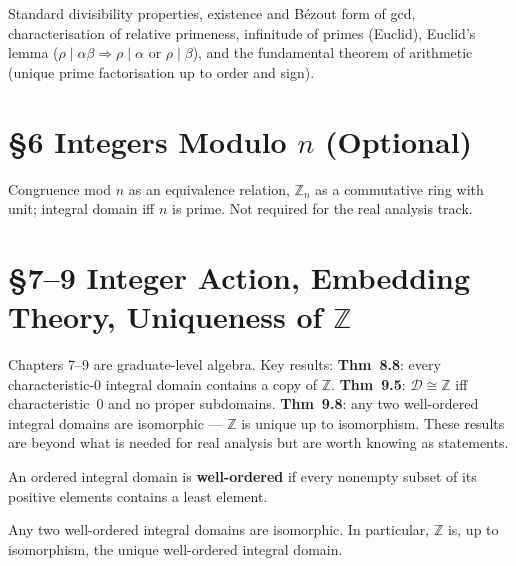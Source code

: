 \begin{theorem}[Mendelson 5.2--5.9]
\label{thm:men-divisibility-properties}
Standard divisibility properties, existence and Bézout form of gcd,
characterisation of relative primeness, infinitude of primes
(Euclid), Euclid's lemma ($\rho\mid\alpha\beta\Rightarrow\rho\mid\alpha$
or $\rho\mid\beta$), and the fundamental theorem of arithmetic
(unique prime factorisation up to order and sign).
\end{theorem}

\section*{§6 \quad Integers Modulo $n$ (Optional)}

\begin{remark}[Scope]
Congruence mod $n$ as an equivalence relation, $\mathbb{Z}_n$ as a
commutative ring with unit; integral domain iff $n$ is prime.
Not required for the real analysis track.
\end{remark}

\section*{§7--9 \quad Integer Action, Embedding Theory,
  Uniqueness of $\mathbb{Z}$}

\begin{remark}[Scope]
Chapters 7--9 are graduate-level algebra.
Key results:
\textbf{Thm~8.8}: every characteristic-$0$ integral domain contains
a copy of $\mathbb{Z}$.
\textbf{Thm~9.5}: $\mathcal{D}\cong\mathbb{Z}$ iff characteristic~$0$
and no proper subdomains.
\textbf{Thm~9.8}: any two well-ordered integral domains are isomorphic
--- $\mathbb{Z}$ is unique up to isomorphism.
These results are beyond what is needed for real analysis but are
worth knowing as statements.
\end{remark}

\begin{definition}
An ordered integral domain is \textbf{well-ordered} if every nonempty
subset of its positive elements contains a least element.
\end{definition}

\begin{theorem}
\label{thm:men-well-ordered-integral-domain-uniqueness}
Any two well-ordered integral domains are isomorphic.
In particular, $\mathbb{Z}$ is, up to isomorphism, the unique
well-ordered integral domain.
\end{theorem}
